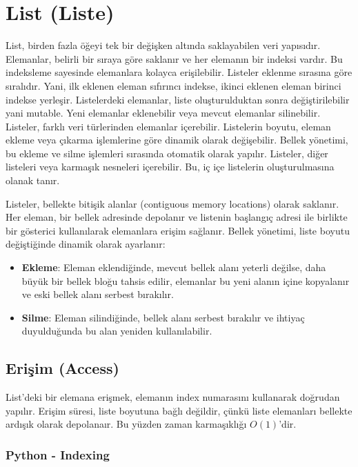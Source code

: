 \section{List (Liste)}

List, birden fazla öğeyi tek bir değişken altında saklayabilen veri yapısıdır. Elemanlar, belirli bir sıraya göre saklanır ve her elemanın bir indeksi vardır. Bu indeksleme sayesinde elemanlara kolayca erişilebilir. Listeler eklenme sırasına göre sıralıdır. Yani, ilk eklenen eleman sıfırıncı indekse, ikinci eklenen eleman birinci indekse yerleşir. Listelerdeki elemanlar, liste oluşturulduktan sonra değiştirilebilir yani mutable. Yeni elemanlar eklenebilir veya mevcut elemanlar silinebilir. Listeler, farklı veri türlerinden elemanlar içerebilir. Listelerin boyutu, eleman ekleme veya çıkarma işlemlerine göre dinamik olarak değişebilir. Bellek yönetimi, bu ekleme ve silme işlemleri sırasında otomatik olarak yapılır. Listeler, diğer listeleri veya karmaşık nesneleri içerebilir. Bu, iç içe listelerin oluşturulmasına olanak tanır.

Listeler, bellekte bitişik alanlar (contiguous memory locations) olarak saklanır. Her eleman, bir bellek adresinde depolanır ve listenin başlangıç adresi ile birlikte bir gösterici kullanılarak elemanlara erişim sağlanır. Bellek yönetimi, liste boyutu değiştiğinde dinamik olarak ayarlanır:

\begin{itemize}
    \item \textbf{Ekleme}: Eleman eklendiğinde, mevcut bellek alanı yeterli değilse, daha büyük bir bellek bloğu tahsis edilir, elemanlar bu yeni alanın içine kopyalanır ve eski bellek alanı serbest bırakılır.
    \item \textbf{Silme}: Eleman silindiğinde, bellek alanı serbest bırakılır ve ihtiyaç duyulduğunda bu alan yeniden kullanılabilir.
\end{itemize}

\subsection{Erişim (Access)}

List'deki bir elemana erişmek, elemanın index numarasını kullanarak doğrudan yapılır. Erişim süresi, liste boyutuna bağlı değildir, çünkü liste elemanları bellekte ardışık olarak depolanaır. Bu yüzden zaman karmaşıklığı $O(1)$'dir.

\subsubsection{Python - Indexing}

